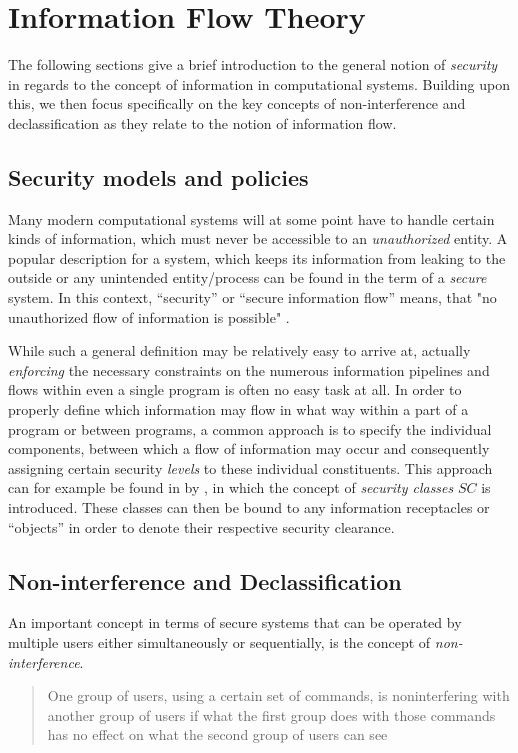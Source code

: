 
\section{Information Flow Theory} 
The following sections give a brief introduction to the general notion of \emph{security} in regards to the concept of information in computational systems.
Building upon this, we then focus specifically on the key concepts of non-interference and declassification as they relate to the notion of information flow.
\subsection{Security models and policies}
Many modern computational systems will at some point have to handle certain kinds of information, which must never be accessible to an \emph{unauthorized} entity.
A popular description for a system, which keeps its information from leaking to the outside or any unintended entity/process can be found in the term of a  \emph{secure} system.
In this context, ``security'' or ``secure information flow'' means, that "no unauthorized flow of information is possible" \cite{lattice_model_security}.

While such a general definition may be relatively easy to arrive at, actually \emph{enforcing} the necessary constraints on the numerous information pipelines and flows within even a single program is often no easy task at all. 
In order to properly define which information may flow in what way within a part of a program or between programs, a common approach is to specify the individual components, between which a flow of information may occur and consequently assigning certain security \emph{levels} to these individual constituents. This approach can for example be found in \cite{lattice_model_security} by \citeauthor{lattice_model_security}, in which the concept of \emph{security classes} \(SC\) is introduced. These classes can then be bound to any information receptacles or ``objects'' in order to denote their respective security clearance.
\subsection{Non-interference and Declassification}
\label{ref:Declass_and_Inter}
An important concept in terms of secure systems that can be operated by multiple users either simultaneously or sequentially, is the concept of \emph{non-interference}.
\begin{quotation}
    One group of users, using a certain set of commands, is noninterfering with another group of users if what the first group does with those commands has no effect on what the second group of users can see
\end{quotation}


